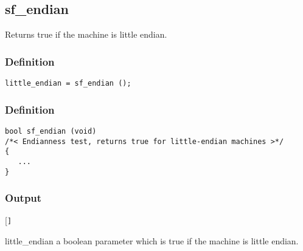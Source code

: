 \subsection{{sf\_endian}}
Returns true if the machine is little endian. 

\subsubsection*{Definition}
\begin{verbatim}little_endian = sf_endian (); \end{verbatim}

\subsubsection*{Definition}
\begin{verbatim}
bool sf_endian (void)
/*< Endianness test, returns true for little-endian machines >*/
{
   ...    
}
\end{verbatim}

\subsubsection*{Output}
\begin{desclist}{\tt }{\quad}[\tt ]
   \setlength\itemsep{0pt}
   \item[little\_endian] a boolean parameter which is true if the machine is little endian.
\end{desclist}





